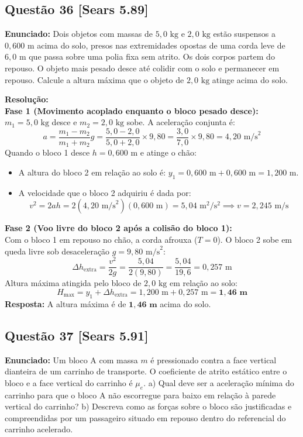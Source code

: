 \documentclass[11pt,a4paper]{article}
\begin{document}
\subsection*{Questão 36 [Sears 5.89]}
\textbf{Enunciado:} Dois objetos com massas de $5,0\text{ kg}$ e $2,0\text{ kg}$ estão suspensos a $0,600\text{ m}$ acima do solo, presos nas extremidades opostas de uma corda leve de $6,0\text{ m}$ que passa sobre uma polia fixa sem atrito. Os dois corpos partem do repouso. O objeto mais pesado desce até colidir com o solo e permanecer em repouso. Calcule a altura máxima que o objeto de $2,0\text{ kg}$ atinge acima do solo.

\noindent
\textbf{Resolução:}\\
\textbf{Fase 1 (Movimento acoplado enquanto o bloco pesado desce):}\\
$m_1 = 5,0\text{ kg}$ desce e $m_2 = 2,0\text{ kg}$ sobe. A aceleração conjunta é:
\[ a = \frac{m_1 - m_2}{m_1 + m_2} g = \frac{5,0 - 2,0}{5,0 + 2,0} \times 9,80 = \frac{3,0}{7,0} \times 9,80 = 4,20\text{ m/s}^2 \]
Quando o bloco 1 desce $h = 0,600\text{ m}$ e atinge o chão:
\begin{itemize}
    \item A altura do bloco 2 em relação ao solo é: $y_1 = 0,600\text{ m} + 0,600\text{ m} = 1,200\text{ m}$.
    \item A velocidade que o bloco 2 adquiriu é dada por:
    \[ v^2 = 2 a h = 2(4,20\text{ m/s}^2)(0,600\text{ m}) = 5,04\text{ m}^2/\text{s}^2 \implies v = 2,245\text{ m/s} \]
\end{itemize}
\textbf{Fase 2 (Voo livre do bloco 2 após a colisão do bloco 1):}\\
Com o bloco 1 em repouso no chão, a corda afrouxa ($T = 0$). O bloco 2 sobe em queda livre sob desaceleração $g = 9,80\text{ m/s}^2$:
\[ \Delta h_{\text{extra}} = \frac{v^2}{2g} = \frac{5,04}{2(9,80)} = \frac{5,04}{19,6} = 0,257\text{ m} \]
Altura máxima atingida pelo bloco de $2,0\text{ kg}$ em relação ao solo:
\[ H_{\text{max}} = y_1 + \Delta h_{\text{extra}} = 1,200\text{ m} + 0,257\text{ m} = \mathbf{1,46\text{ m}} \]
\textbf{Resposta:} A altura máxima é de $\mathbf{1,46\text{ m}}$ acima do solo.

\vspace{0.3cm}
\subsection*{Questão 37 [Sears 5.91]}
\textbf{Enunciado:} Um bloco A com massa $m$ é pressionado contra a face vertical dianteira de um carrinho de transporte. O coeficiente de atrito estático entre o bloco e a face vertical do carrinho é $\mu_e$. a) Qual deve ser a aceleração mínima do carrinho para que o bloco A não escorregue para baixo em relação à parede vertical do carrinho? b) Descreva como as forças sobre o bloco são justificadas e compreendidas por um passageiro situado em repouso dentro do referencial do carrinho acelerado.
\end{document}
